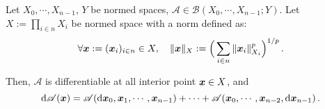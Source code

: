 \documentclass[openany]{book}
\begin{document}
\begin{theorem}
	\label{theorem: differentiation of multilinear operators}
	Let $X_0, \cdots, X_{n - 1}$, $Y$ be normed spaces, $\mathscr A \in \mathcal B(X_0, \cdots, X_{n - 1}; Y)$. 
	Let $X := \prod_{i \in n} X_i$ be normed space with a norm defined as:
	\begin{equation}\label{equation: norm of product space}
		\forall \boldsymbol{x} := (\boldsymbol{x}_i)_{i \in n} \in X, \quad
		\|\boldsymbol{x}\|_X := \Big( \sum_{i \in n} \|\boldsymbol{x}_i\|_{X_i}^p \Big)^{1/p}\,.
	\end{equation}

	Then, $\mathscr A$ is differentiable at all interior point $\boldsymbol{x} \in X$, and
	\begin{equation*}
		\mathrm{d} \mathscr A (\boldsymbol{x}) = \mathscr A(\mathrm{d} \boldsymbol{x}_0, \boldsymbol{x}_1, \cdots, \boldsymbol{x}_{n - 1}) + \cdots + \mathscr A(\boldsymbol{x}_0, \cdots, \boldsymbol{x}_{n-2}, \mathrm{d} \boldsymbol{x}_{n-1})\,.
	\end{equation*}
\end{theorem}
\end{document}
